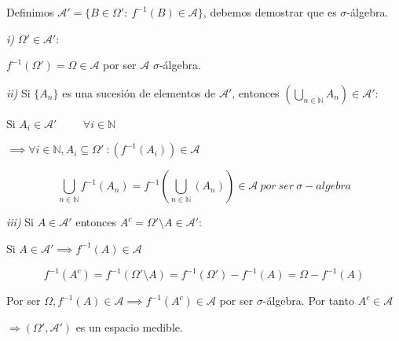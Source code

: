 
Definimos $\mathcal{A}'=\{ B\in\Omega ':\ f^{-1}(B)\in \mathcal{A} \}$, debemos demostrar que es $\sigma$-álgebra.

\textit{i)}
$\Omega ' \in \mathcal{A}'$:

$f^{-1}(\Omega ') = \Omega\in\mathcal{A}$ por ser $\mathcal{A}$ $\sigma$-álgebra.

\textit{ii)}
Si $\{A_n\}$ es una sucesión de elementos de $\mathcal{A}'$, entonces $\left( \bigcup_{n\in\mathbb{N}}A_n \right) \in \mathcal{A}'$:

Si $A_i \in \mathcal{A}' \hspace{1cm} \forall i \in \mathbb{N}$

$\implies \forall i\in\mathbb{N}, A_i\subseteq\Omega '\ : \left( f^{-1}(A_i)\right) \in \mathcal{A}$

\[ \bigcup_{n \in \mathbb{N} }f^{-1}(A_n) 
= f^{-1}\left( \bigcup_{n \in \mathbb{N} }(A_n) \right)
\in \mathcal{A} \ por \ ser \ \sigma -algebra\] 

\textit{iii)}
Si $A\in\mathcal{A}'$ entonces $A^c=\Omega '\setminus A \in \mathcal{A}'$:

Si $A\in \mathcal{A}' \implies f^{-1}(A)\in \mathcal{A}$

\[f^{-1}(A^c) = f^{-1}(\Omega'\setminus A) = f^{-1}(\Omega') - f^{-1}(A) = \Omega - f^{-1}(A) \]

Por ser $\Omega , f^{-1}(A)\in \mathcal{A} \implies f^{-1}(A^c)\in \mathcal{A}$ por ser $\sigma$-álgebra. Por tanto $A^c\in \mathcal{A}$

$\Longrightarrow (\Omega', \mathcal{A}')$ es un espacio medible. 